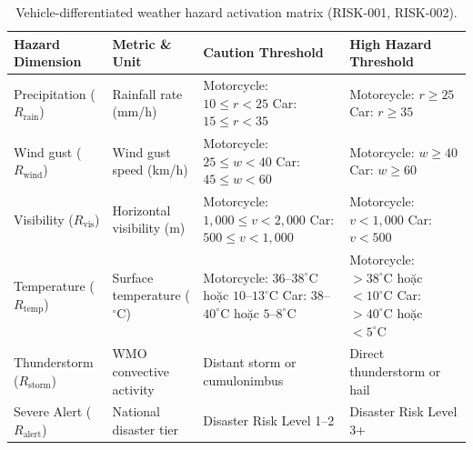 \begin{table}[H]
\centering
\small
\caption[Vehicle-differentiated weather hazard activation matrix]{Vehicle-differentiated weather hazard activation matrix (RISK-001, RISK-002).}
\label{tab:vehicle_risk_matrix_en}
\begin{tabularx}{\textwidth}{l >{\raggedright\arraybackslash}p{2.8cm} X X}
\toprule
\textbf{Hazard Dimension} & \textbf{Metric \& Unit} & \textbf{Caution Threshold} & \textbf{High Hazard Threshold} \\
\midrule
Precipitation ($R_{\text{rain}}$) & Rainfall rate (mm/h) & 
Motorcycle: $10 \le r < 25$ \newline Car: $15 \le r < 35$ & 
Motorcycle: $r \ge 25$ \newline Car: $r \ge 35$ \\
\addlinespace
Wind gust ($R_{\text{wind}}$) & Wind gust speed (km/h) & 
Motorcycle: $25 \le w < 40$ \newline Car: $45 \le w < 60$ & 
Motorcycle: $w \ge 40$ \newline Car: $w \ge 60$ \\
\addlinespace
Visibility ($R_{\text{vis}}$) & Horizontal visibility (m) & 
Motorcycle: $1,000 \le v < 2,000$ \newline Car: $500 \le v < 1,000$ & 
Motorcycle: $v < 1,000$ \newline Car: $v < 500$ \\
\addlinespace
Temperature ($R_{\text{temp}}$) & Surface temperature ($^\circ\text{C}$) & 
Motorcycle: $36$--$38^\circ\text{C}$ hoặc $10$--$13^\circ\text{C}$ \newline Car: $38$--$40^\circ\text{C}$ hoặc $5$--$8^\circ\text{C}$ & 
Motorcycle: $> 38^\circ\text{C}$ hoặc $< 10^\circ\text{C}$ \newline Car: $> 40^\circ\text{C}$ hoặc $< 5^\circ\text{C}$ \\
\addlinespace
Thunderstorm ($R_{\text{storm}}$) & WMO convective activity & 
Distant storm or cumulonimbus & 
Direct thunderstorm or hail \\
\addlinespace
Severe Alert ($R_{\text{alert}}$) & National disaster tier & 
Disaster Risk Level 1--2 & 
Disaster Risk Level 3+ \\
\bottomrule
\end{tabularx}
\end{table}

